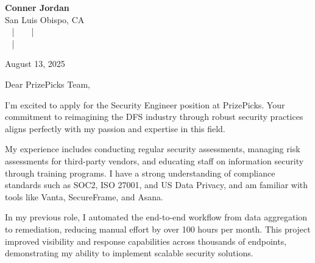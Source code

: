 \documentclass[letterpaper,11pt]{article}
\begin{document}
\begin{center}
  {\Huge \textbf{Conner Jordan}}\\[4pt]
  {\Large San Luis Obispo, CA}\\[4pt]
  \href{tel:+18059759793}{
    } ~ | ~
  \href{mailto:connercharlesjordan@gmail.com}{
    } ~ | ~
   \\
  \href{https://www.linkedin.com/in/conner-jordan-4b268514a/}{
    } ~ | ~
  \href{https://github.com/cjordan223}{
    }
\end{center}



\vspace{16pt}

\begin{flushright}
August 13, 2025
\end{flushright}



Dear PrizePicks Team,

\vspace{16pt}

I'm excited to apply for the Security Engineer position at PrizePicks. Your commitment to reimagining the DFS industry through robust security practices aligns perfectly with my passion and expertise in this field.

\vspace{16pt}

My experience includes conducting regular security assessments, managing risk assessments for third-party vendors, and educating staff on information security through training programs. I have a strong understanding of compliance standards such as SOC2, ISO 27001, and US Data Privacy, and am familiar with tools like Vanta, SecureFrame, and Asana.

\vspace{16pt}

In my previous role, I automated the end-to-end workflow from data aggregation to remediation, reducing manual effort by over 100 hours per month. This project improved visibility and response capabilities across thousands of endpoints, demonstrating my ability to implement scalable security solutions.
\end{document}
